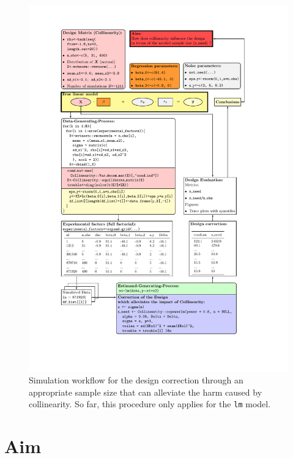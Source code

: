 \documentclass[11pt,a4paper,twoside]{book}\usepackage[]{graphicx}\usepackage[]{xcolor}
\begin{document}
\newpage
\begin{figure}[H]
\begin{center}
\vspace*{-1cm}
\hspace*{-1cm}
\includegraphics[width=1.2\textwidth]{../sim_workflow_tikz/flow_design}
\vspace*{-30mm}
\caption{Simulation workflow for the design correction through an appropriate sample size that can alleviate the harm caused by collinearity. So far, this procedure only applies for the \texttt{lm} model.}
\label{fig:sim_design}
\end{center}
\end{figure}


\section{Aim}\label{sec:sim_aim}
\end{document}
